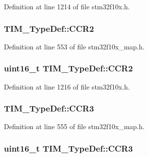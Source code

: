 Definition at line 1214 of file stm32f10x.\+h.

\subsubsection[{\texorpdfstring{C\+C\+R2}{CCR2}}]{ T\+I\+M\+\_\+\+Type\+Def\+::\+C\+C\+R2}\hypertarget{struct_t_i_m___type_def_ae237538fadf96b33df184c1c6b1abb83}{}\label{struct_t_i_m___type_def_ae237538fadf96b33df184c1c6b1abb83}


Definition at line 553 of file stm32f10x\+\_\+map.\+h.

\subsubsection[{\texorpdfstring{C\+C\+R2}{CCR2}}]{ {\bf uint16\+\_\+t} T\+I\+M\+\_\+\+Type\+Def\+::\+C\+C\+R2}\hypertarget{struct_t_i_m___type_def_ae72bdd579eec96a3b863fb1720195f50}{}\label{struct_t_i_m___type_def_ae72bdd579eec96a3b863fb1720195f50}


Definition at line 1216 of file stm32f10x.\+h.

\subsubsection[{\texorpdfstring{C\+C\+R3}{CCR3}}]{ T\+I\+M\+\_\+\+Type\+Def\+::\+C\+C\+R3}\hypertarget{struct_t_i_m___type_def_a39be349da94c8a7513e932f3072f368b}{}\label{struct_t_i_m___type_def_a39be349da94c8a7513e932f3072f368b}


Definition at line 555 of file stm32f10x\+\_\+map.\+h.

\subsubsection[{\texorpdfstring{C\+C\+R3}{CCR3}}]{ {\bf uint16\+\_\+t} T\+I\+M\+\_\+\+Type\+Def\+::\+C\+C\+R3}\hypertarget{struct_t_i_m___type_def_ad8c1bcb20bf3080af8440994a247cc9c}{}\label{struct_t_i_m___type_def_ad8c1bcb20bf3080af8440994a247cc9c}


